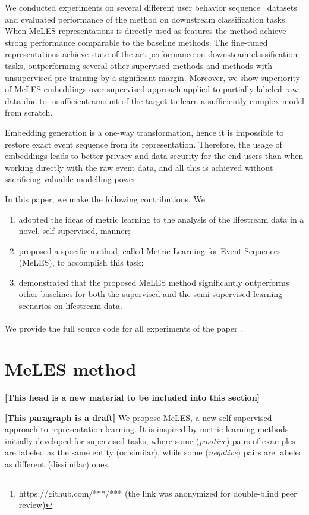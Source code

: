 \documentclass{article}
\newcommand{\nt}[1]{{\bf [#1]}}
\begin{document}
We conducted experiments on several different user behavior sequence~\cite{Ni2018PerceiveYU} datasets and evaluated performance of the method on downstream classification tasks. When MeLES representations is directly used as features the method achieve strong performance comparable to the baseline methods. The fine-tuned representations achieve state-of-the-art performance on downsteam classification tasks, outperforming several other supervised methods and methods with unsupervised pre-training by a significant margin. Moreover, we show superiority of MeLES embeddings over supervised approach applied to partially labeled raw data due to insufficient amount of the target to learn a sufficiently complex model from scratch.

Embedding generation is a one-way transformation, hence it is impossible to restore exact event sequence from its representation. Therefore, the usage of embeddings leads to better privacy and data security for the end users than when working directly with the raw event data, and all this is achieved without sacrificing valuable modelling power.

In this paper, we make the following contributions. We
\begin{enumerate}
    \item adopted the ideas of metric learning to the analysis of the lifestream data in a novel, self-supervised, manner;
    \item proposed a specific method, called Metric Learning for Event Sequences (MeLES), to accomplish this task; 
    \item demonstrated that the proposed MeLES method significantly outperforms other baselines for both the supervised and the semi-supervised learning scenarios on lifestream data.
\end{enumerate}

We provide the full source code for all experiments of the paper\footnote{https://github.com/***/*** (the link was anonymized for double-blind peer review)}.


\section{MeLES method} \label{sec-method}

\nt{This head is a new material to be included into this section}

\nt{This paragraph is a draft}
We propose MeLES, a new self-supervised approach to representation learning. It is inspired by metric learning methods initially developed for supervised tasks, where some (\textit{positive}) pairs of examples are labeled as the same entity (or similar), while some (\textit{negative}) pairs are labeled as different (dissimilar) ones.
\end{document}
